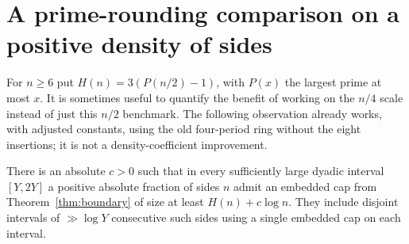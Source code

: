 \documentclass[11pt]{article}
\begin{document}
\appendix\section{A prime-rounding comparison on a positive density of sides}
For $n\ge6$ put $H(n)=3(P(n/2)-1)$, with $P(x)$ the largest prime at most $x$. It is sometimes useful to quantify the benefit of working on the $n/4$ scale instead of just this $n/2$ benchmark. The following observation already works, with adjusted constants, using the old four-period ring without the eight insertions; it is not a density-coefficient improvement.

\begin{proposition}There is an absolute $c>0$ such that in every sufficiently large dyadic interval $[Y,2Y]$ a positive absolute fraction of sides $n$ admit an embedded cap from Theorem~\ref{thm:boundary} of size at least $H(n)+c\log n$. They include disjoint intervals of $\gg\log Y$ consecutive such sides using a single embedded cap on each interval.\end{proposition}
\end{document}
